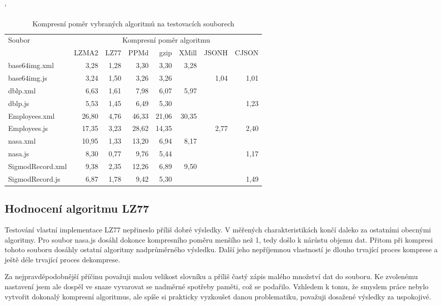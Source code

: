 \begin{table}[!h]
\catcode`
\centering
\begin{tabular}{|l|r|r|r|r|r|r|r|}
\hline
 \multirow{2}{*}{Soubor} & \multicolumn{7}{|c|}{Kompresní poměr algoritmu}\\
 \cline{2-8}
 & LZMA2 & LZ77 & PPMd & gzip & XMill & JSONH & CJSON\\
 \hline
 base64img.xml & 3,28 & 1,28 & 3,30 & 3,30 & 3,28 & & \\
 base64img.js & 3,24 & 1,50 & 3,26 & 3,26 & & 1,04 & 1,01\\
 \hline
 dblp.xml & 6,63 & 1,61 & 7,98 & 6,07 & 5,97 & & \\
 dblp.js & 5,53 & 1,45 & 6,49 & 5,30 & & & 1,23\\
 \hline
 Employees.xml & 26,80 & 4,76 & 46,33 & 21,06 & 30,35 & & \\
 Employees.js & 17,35 & 3,23 & 28,62 & 14,35 & & 2,77 & 2,40\\
 \hline
 nasa.xml & 10,95 & 1,33 & 13,20 & 6,94 & 8,17 & & \\
 nasa.js & 8,30 & 0,77 & 9,76 & 5,44 & & & 1,17\\
 \hline
 SigmodRecord.xml & 9,38 & 2,35 & 12,26 & 6,89 & 9,50 & & \\
 SigmodRecord.js & 6,87 & 1,78 & 9,42 & 5,30 & & & 1,49\\
\hline
\end{tabular}
\caption{Kompresní poměr vybraných algoritmů na testovacích souborech}
\label{tabulkaKompresniPomer}
\end{table}

\subsection{Hodnocení algoritmu LZ77}
Testování vlastní implementace LZ77 nepřineslo příliš dobré výsledky. V měřených charakteristikách končí daleko za ostatními obecnými algoritmy. Pro soubor nasa.js dosáhl dokonce kompresního poměru menšího než 1, tedy došlo k nárůstu objemu dat. Přitom při kompresi tohoto souboru dosáhly ostatní algoritmy nadprůměrného výsledku. Další jeho nepříjemnou vlastností je dlouho trvající proces komprese a ještě déle trvající proces dekomprese.

Za nejpravděpodobnější příčinu považuji malou velikost slovníku a příliš častý zápis malého množství dat do souboru. Ke zvolenému nastavení jsem ale dospěl ve snaze vyvarovat se nadměrné spotřeby paměti, což se podařilo. Vzhledem k tomu, že smyslem práce nebylo vytvořit dokonalý kompresní algoritmus, ale spíše si prakticky vyzkoušet danou problematiku, považuji dosažené výsledky za uspokojivé.

